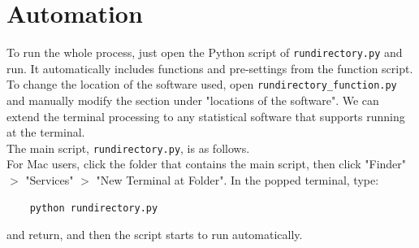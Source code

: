 \documentclass[12pt, a4paper]{article}
\begin{document}
\section{Automation}

To run the whole process, just open the Python script of \texttt{rundirectory.py} and run. It automatically includes functions and pre-settings from the function script.\\

To change the location of the software used, open \texttt{rundirectory\_function.py} and manually modify the section under "locations of the software". We can extend the terminal processing to any statistical software that supports running at the terminal.\\

The main script, \texttt{rundirectory.py}, is as follows.\\



For Mac users, click the folder that contains the main script, then click "Finder" $>$ "Services" $>$ "New Terminal at Folder". In the popped terminal, type:
\begin{verbatim}
	python rundirectory.py
\end{verbatim}
and return, and then the script starts to run automatically.\\

\nocite{*}
\printbibliography
\end{document}
